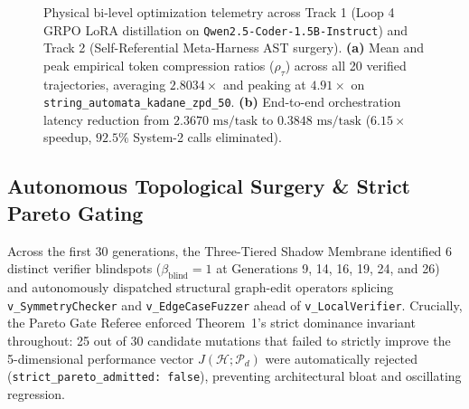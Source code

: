 \documentclass[10pt,twocolumn,letterpaper]{article}
\begin{document}
\begin{figure}[t]
\caption{Physical bi-level optimization telemetry across Track 1 (Loop 4 GRPO LoRA distillation on \texttt{Qwen2.5-Coder-1.5B-Instruct}) and Track 2 (Self-Referential Meta-Harness AST surgery). \textbf{(a)} Mean and peak empirical token compression ratios ($\rho_{\tau}$) across all 20 verified trajectories, averaging $2.8034\times$ and peaking at $4.91\times$ on \texttt{string\_automata\_kadane\_zpd\_50}. \textbf{(b)} End-to-end orchestration latency reduction from $2.3670\text{ ms/task}$ to $0.3848\text{ ms/task}$ ($6.15\times$ speedup, $92.5\%$ System-2 calls eliminated).}
\label{fig:track1_track2_plots}
\end{figure}

\subsection{Autonomous Topological Surgery \& Strict Pareto Gating}
Across the first 30 generations, the Three-Tiered Shadow Membrane identified 6 distinct verifier blindspots ($\beta_{\text{blind}}=1$ at Generations 9, 14, 16, 19, 24, and 26) and autonomously dispatched structural graph-edit operators splicing \texttt{v\_SymmetryChecker} and \texttt{v\_EdgeCaseFuzzer} ahead of \texttt{v\_LocalVerifier}. Crucially, the Pareto Gate Referee enforced Theorem~1's strict dominance invariant throughout: 25 out of 30 candidate mutations that failed to strictly improve the 5-dimensional performance vector $J(\mathcal{H};\mathcal{P}_{d})$ were automatically rejected (\texttt{strict\_\allowbreak pareto\_\allowbreak admitted: false}), preventing architectural bloat and oscillating regression.
\end{document}
